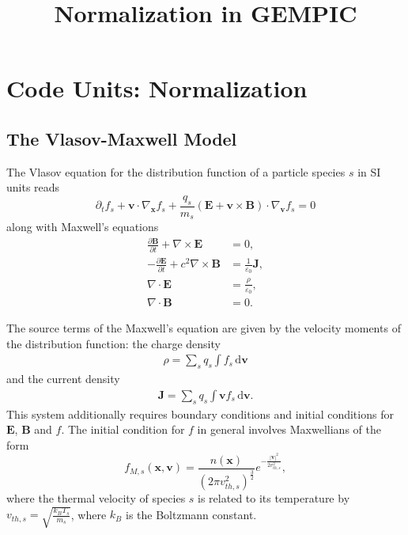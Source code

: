 \documentclass[english]{article}
\title{Normalization in GEMPIC}
\newcommand{\bx}{\textbf{x}}
\newcommand{\bv}{\textbf{v}}
\newcommand{\bB}{\textbf{B}}
\newcommand{\bE}{\textbf{E}}
\newcommand{\bJ}{\textbf{J}}
\newcommand{\du}{\,\mathrm{d}}
\begin{document}
\maketitle

\section{Code Units: Normalization}

\subsection{The Vlasov-Maxwell Model}

The Vlasov equation for the distribution function of a particle species $s$ in SI units reads
\begin{equation}\label{eq:Vlasov}
	\partial_t f_s + \bv \cdot \nabla_{\bx} f_s + \frac{q_s}{m_s} \left( \bE + \bv \times \bB \right) \cdot \nabla_{\bv} f_s = 0
\end{equation}
along with Maxwell's equations
\begin{align}
	\frac{\partial \bB}{\partial t} + \nabla \times \bE      & = 0,                          \\
	- \frac{\partial \bE}{\partial t} + c^2\nabla \times \bB & = \frac{1}{\varepsilon_0}\bJ, \\
	\nabla \cdot \bE                                         & = \frac{\rho}{\varepsilon_0}, \\
	\nabla \cdot \bB                                         & = 0.
\end{align}

The source terms of the Maxwell's equation are given by the velocity moments of the distribution function: the charge density
\begin{align*}
	\rho= \sum_s q_s \int f_s \du\bv
\end{align*}
and the current density
\begin{align*}
	\bJ =\sum_s q_s\int \bv f_s \du\bv.
\end{align*}
This system additionally requires boundary conditions and initial conditions for $\mathbf{E}$, $\mathbf{B}$ and $f$.
The initial condition for $f$ in general involves Maxwellians of the form
\begin{equation}\label{eq:maxwellian}
	f_{M,s}(\mathbf{x},\mathbf{v})= \frac{n(\mathbf{x})}{(2\pi v_{th,s}^2)^{\frac 32}} e^{-\frac{|\bv|^2}{2v_{th,s}^2}},
\end{equation}
where the thermal velocity of species $s$ is related to its temperature by $v_{th,s}=\sqrt{\frac{k_B T_s}{m_s}}$, where $k_B$ is the Boltzmann constant.
\end{document}
